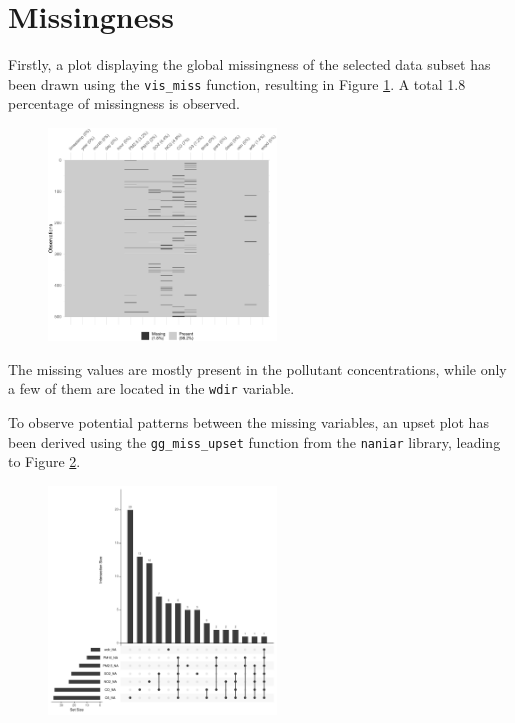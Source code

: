 \documentclass[a4paper, 12pt]{article}
\begin{document}
	\section{Missingness}
	Firstly, a plot displaying the global missingness of the selected data subset has been drawn using the \texttt{vis\_miss} function, resulting in Figure \ref{fig:vis_miss}. A total \num{1.8} percentage of missingness is observed. \par
	\begin{figure}
	    \vspace{-2em}
	    \centering
	    \includegraphics[width=0.54\textwidth]{resources/pdf/missingness_visualization.pdf}
	    \label{fig:vis_miss}
	    \vspace{-1em}
	\end{figure}
	The missing values are mostly present in the pollutant concentrations, while only a few of them are located in the \texttt{wdir} variable. \par
	To observe potential patterns between the missing variables, an upset plot has been derived using the \texttt{gg\_miss\_upset} function from the \texttt{naniar} library, leading to Figure \ref{fig:gg_miss_upset}. \par
	\begin{figure}
	    \vspace{-1em}
	    \centering
	    \includegraphics[width=0.54\textwidth]{resources/pdf/missingness_patterns.pdf}
	    \label{fig:gg_miss_upset}
	    \vspace{-1em}
	\end{figure}
\end{document}
